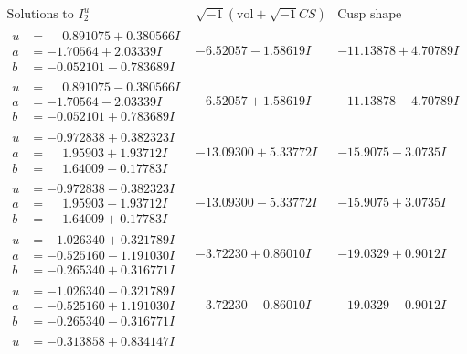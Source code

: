 \documentclass[1p]{elsarticle_modified}
\theoremstyle{definition}
\newcommand{\I}{\sqrt{-1}}
\begin{document}
$$\begin{array}{c|c|c}  
\text{Solutions to }I^u_{2}& \I (\text{vol} + \sqrt{-1}CS) & \text{Cusp shape}\\
 \hline 
\begin{aligned}
u &= \phantom{-}0.891075 + 0.380566 I \\
a &= -1.70564 + 2.03339 I \\
b &= -0.052101 - 0.783689 I\end{aligned}
 & -6.52057 - 1.58619 I & -11.13878 + 4.70789 I \\ \hline\begin{aligned}
u &= \phantom{-}0.891075 - 0.380566 I \\
a &= -1.70564 - 2.03339 I \\
b &= -0.052101 + 0.783689 I\end{aligned}
 & -6.52057 + 1.58619 I & -11.13878 - 4.70789 I \\ \hline\begin{aligned}
u &= -0.972838 + 0.382323 I \\
a &= \phantom{-}1.95903 + 1.93712 I \\
b &= \phantom{-}1.64009 - 0.17783 I\end{aligned}
 & -13.09300 + 5.33772 I & -15.9075 - 3.0735 I \\ \hline\begin{aligned}
u &= -0.972838 - 0.382323 I \\
a &= \phantom{-}1.95903 - 1.93712 I \\
b &= \phantom{-}1.64009 + 0.17783 I\end{aligned}
 & -13.09300 - 5.33772 I & -15.9075 + 3.0735 I \\ \hline\begin{aligned}
u &= -1.026340 + 0.321789 I \\
a &= -0.525160 - 1.191030 I \\
b &= -0.265340 + 0.316771 I\end{aligned}
 & -3.72230 + 0.86010 I & -19.0329 + 0.9012 I \\ \hline\begin{aligned}
u &= -1.026340 - 0.321789 I \\
a &= -0.525160 + 1.191030 I \\
b &= -0.265340 - 0.316771 I\end{aligned}
 & -3.72230 - 0.86010 I & -19.0329 - 0.9012 I \\ \hline\begin{aligned}
u &= -0.313858 + 0.834147 I \\

\end{aligned}
\end{array}$$
\end{document}
